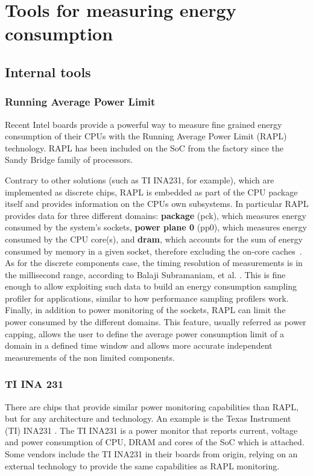 \section{Tools for measuring energy consumption}

\subsection*{Internal tools}

\subsubsection*{Running Average Power Limit}
Recent Intel boards provide a powerful way to measure fine grained energy consumption of their CPUs with the Running Average Power Limit (RAPL) technology. RAPL has been included on the SoC from the factory since the Sandy Bridge family of processors.

Contrary to other solutions (such as TI INA231, for example), which are implemented as discrete
chips, RAPL is embedded as part of the CPU package itself and
provides information on the CPUs own subsystems. In particular RAPL
provides data for three different domains: \textbf{package} (pck),
which measures energy consumed by the system's sockets, \textbf{power
plane 0} (pp0), which measures energy consumed by the CPU core(s),
and \textbf{dram}, which accounts for the sum of energy consumed
by memory in a given socket, therefore excluding the on-core
caches~\cite{INTELMAN}. As for the discrete components case, the
timing resolution of measurements is in the millisecond range, according to Balaji Subramaniam, et al. \cite{RAPL1}.
This is fine enough to allow exploiting such data to build an energy
consumption sampling profiler for applications, similar to how performance
sampling profilers work.
Finally, in addition to power
monitoring of the sockets, RAPL can limit the power consumed by the
different domains. This feature, usually referred as power capping,
allows the user to define the average power consumption limit of a
domain in a defined time window and allows more accurate independent
measurements of the non limited components.

\subsubsection*{TI INA 231}
There are chips that provide similar power monitoring capabilities than RAPL, but for any architecture and technology. An example is the Texas Instrument (TI) INA231 \cite{TIINA231}. The TI INA231 is a power monitor that reports current, voltage and power consumption of CPU, DRAM and cores of the SoC which is attached. Some vendors include the TI INA231 in their boards from origin, relying on an external technology to provide the same capabilities as RAPL monitoring.

